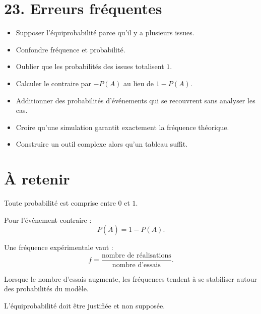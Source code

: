 \section{23. Erreurs fréquentes}

\begin{itemize}
\item Supposer l'équiprobabilité parce qu'il y a plusieurs issues.
\item Confondre fréquence et probabilité.
\item Oublier que les probabilités des issues totalisent $1$.
\item Calculer le contraire par $-P(A)$ au lieu de $1-P(A)$.
\item Additionner des probabilités d'événements qui se recouvrent sans analyser les cas.
\item Croire qu'une simulation garantit exactement la fréquence théorique.
\item Construire un outil complexe alors qu'un tableau suffit.
\end{itemize}

\section{À retenir}

\begin{aretenir}
Toute probabilité est comprise entre $0$ et $1$.

Pour l'événement contraire :
\[
\boxed{P(\overline A)=1-P(A)}.
\]

Une fréquence expérimentale vaut :
\[
\boxed{f=\dfrac{\text{nombre de réalisations}}{\text{nombre d'essais}}}.
\]

Lorsque le nombre d'essais augmente, les fréquences tendent à se stabiliser autour des probabilités du modèle.

L'équiprobabilité doit être justifiée et non supposée.
\end{aretenir}
